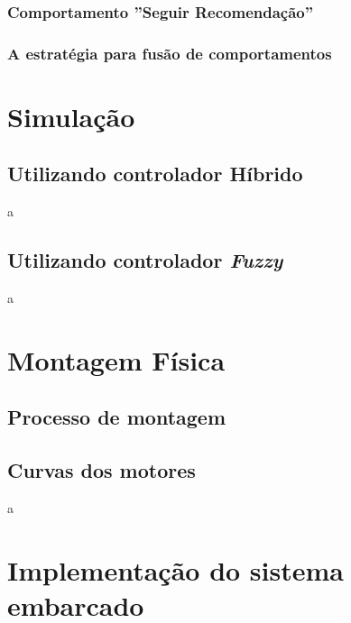 	
	
	\subsubsection{Comportamento ''Seguir Recomendação''}
	
	
	
	
	
	
	
	
	
	
		
	\subsubsection{A estratégia para fusão de comportamentos}
	
\section{Simulação}

	\subsection{Utilizando controlador Híbrido}
	
	a
	
	\subsection{Utilizando controlador \textit{Fuzzy}}
	
	a
	
\section{Montagem Física}

	\subsection{Processo de montagem}

	\subsection{Curvas dos motores}

a
	
\section{Implementação do sistema embarcado}

